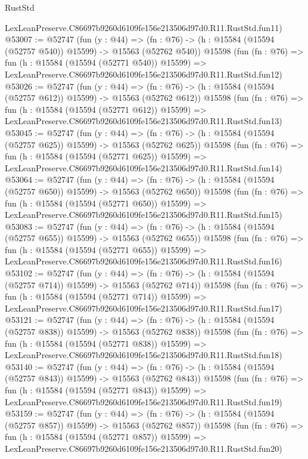 \begin{lexlean}{RustStd}
\begin{coremodule}
    LexLeanPreserve.C86697b9260d6109fe156e213506d97d0.R11.RustStd.fun11)
@53007 := @52747
    (fun (y : @44) =>
    (fn : @76) -> (h : @15584 (@15594 (@52757 @540)) @15599) -> @15563 (@52762 @540))
    @15598
    (fun (fn : @76) =>
    fun (h : @15584 (@15594 (@52771 @540)) @15599) =>
    LexLeanPreserve.C86697b9260d6109fe156e213506d97d0.R11.RustStd.fun12)
@53026 := @52747
    (fun (y : @44) =>
    (fn : @76) -> (h : @15584 (@15594 (@52757 @612)) @15599) -> @15563 (@52762 @612))
    @15598
    (fun (fn : @76) =>
    fun (h : @15584 (@15594 (@52771 @612)) @15599) =>
    LexLeanPreserve.C86697b9260d6109fe156e213506d97d0.R11.RustStd.fun13)
@53045 := @52747
    (fun (y : @44) =>
    (fn : @76) -> (h : @15584 (@15594 (@52757 @625)) @15599) -> @15563 (@52762 @625))
    @15598
    (fun (fn : @76) =>
    fun (h : @15584 (@15594 (@52771 @625)) @15599) =>
    LexLeanPreserve.C86697b9260d6109fe156e213506d97d0.R11.RustStd.fun14)
@53064 := @52747
    (fun (y : @44) =>
    (fn : @76) -> (h : @15584 (@15594 (@52757 @650)) @15599) -> @15563 (@52762 @650))
    @15598
    (fun (fn : @76) =>
    fun (h : @15584 (@15594 (@52771 @650)) @15599) =>
    LexLeanPreserve.C86697b9260d6109fe156e213506d97d0.R11.RustStd.fun15)
@53083 := @52747
    (fun (y : @44) =>
    (fn : @76) -> (h : @15584 (@15594 (@52757 @655)) @15599) -> @15563 (@52762 @655))
    @15598
    (fun (fn : @76) =>
    fun (h : @15584 (@15594 (@52771 @655)) @15599) =>
    LexLeanPreserve.C86697b9260d6109fe156e213506d97d0.R11.RustStd.fun16)
@53102 := @52747
    (fun (y : @44) =>
    (fn : @76) -> (h : @15584 (@15594 (@52757 @714)) @15599) -> @15563 (@52762 @714))
    @15598
    (fun (fn : @76) =>
    fun (h : @15584 (@15594 (@52771 @714)) @15599) =>
    LexLeanPreserve.C86697b9260d6109fe156e213506d97d0.R11.RustStd.fun17)
@53121 := @52747
    (fun (y : @44) =>
    (fn : @76) -> (h : @15584 (@15594 (@52757 @838)) @15599) -> @15563 (@52762 @838))
    @15598
    (fun (fn : @76) =>
    fun (h : @15584 (@15594 (@52771 @838)) @15599) =>
    LexLeanPreserve.C86697b9260d6109fe156e213506d97d0.R11.RustStd.fun18)
@53140 := @52747
    (fun (y : @44) =>
    (fn : @76) -> (h : @15584 (@15594 (@52757 @843)) @15599) -> @15563 (@52762 @843))
    @15598
    (fun (fn : @76) =>
    fun (h : @15584 (@15594 (@52771 @843)) @15599) =>
    LexLeanPreserve.C86697b9260d6109fe156e213506d97d0.R11.RustStd.fun19)
@53159 := @52747
    (fun (y : @44) =>
    (fn : @76) -> (h : @15584 (@15594 (@52757 @857)) @15599) -> @15563 (@52762 @857))
    @15598
    (fun (fn : @76) =>
    fun (h : @15584 (@15594 (@52771 @857)) @15599) =>
    LexLeanPreserve.C86697b9260d6109fe156e213506d97d0.R11.RustStd.fun20)

\end{coremodule}
\end{lexlean}
